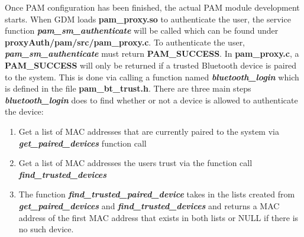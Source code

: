 \documentclass[letterpaper,twocolumn,10pt]{article}
\begin{document}
Once PAM configuration has been finished, the actual PAM module development starts. When GDM loads \textbf{pam\_proxy.so} to authenticate the user, the service function \textbf{\emph{pam\_sm\_authenticate}} will be called which can be found under \textbf{proxyAuth/pam/src/pam\_proxy.c}. To authenticate the user, \textbf{\emph{pam\_sm\_authenticate}} must return \textbf{PAM\_SUCCESS}. In \textbf{pam\_proxy.c}, a \textbf{PAM\_SUCCESS} will only be returned if a trusted Bluetooth device is paired to the system. This is done via calling a function named \textbf{\emph{bluetooth\_login}} which is defined in the file \textbf{pam\_bt\_trust.h}. There are three main steps \textbf{\emph{bluetooth\_login}} does to find whether or not a device is allowed to authenticate the device:
\begin{enumerate}[noitemsep]
\item Get a list of MAC addresses that are currently paired to the system via \textbf{\emph{get\_paired\_devices}} function call
\item Get a list of MAC addresses the users trust via the function call \textbf{\emph{find\_trusted\_devices}}
\item The function \textbf{\emph{find\_trusted\_paired\_device}} takes in the lists created from \textbf{\emph{get\_paired\_devices}} and \textbf{\emph{find\_trusted\_devices}} and returns a MAC address of the first MAC address that exists in both lists or NULL if there is no such device.
\end{enumerate}
\end{document}
